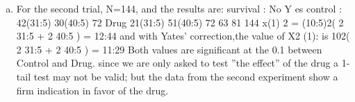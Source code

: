 \documentclass[a4paper,12pt]{article}
\begin{document}
\begin{enumerate}[(a)]
\begin{table}[ht!]
\end{table}

\item 
For the second trial, N=144, and the results are:
survival : No Y es
control : 42(31:5) 30(40:5) 72
Drug 21(31:5) 51(40:5) 72
63 81 144
x(1)
2 = (10:5)2(
2
31:5
+
2
40:5
) = 12:44
and with Yates’ correction,the value of X2
(1): is 102( 2
31:5 + 2
40:5 ) = 11:29
Both values are significant at the 0.1%
between Control and Drug.
since we are only asked to test ”the effect” of the drug a 1-tail test may not be valid;
but the data from the second experiment show a firm indication in favor of the drug.
\end{enumerate}
\end{document}
